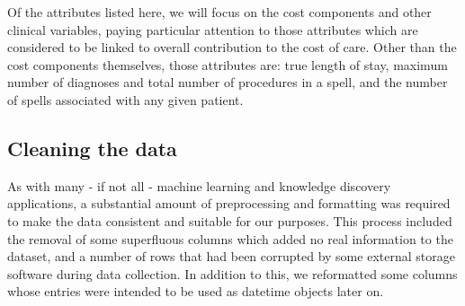 Of the attributes listed here, we will focus on the cost components and other
clinical variables, paying particular attention to those attributes which are
considered to be linked to overall contribution to the cost of care. Other than
the cost components themselves, those attributes are: true length of stay,
maximum number of diagnoses and total number of procedures in a spell, and the
number of spells associated with any given patient.

\subsection{Cleaning the data}\label{subsec:formatting}

As with many \-- if not all \-- machine learning and knowledge discovery
applications, a substantial amount of preprocessing and formatting was required
to make the data consistent and suitable for our purposes. This process included
the removal of some superfluous columns which added no real information to the
dataset, and a number of rows that had been corrupted by some external storage
software during data collection. In addition to this, we reformatted some
columns whose entries were intended to be used as datetime objects later on.

